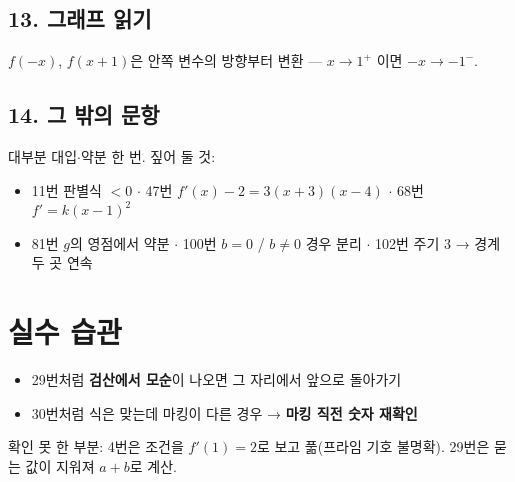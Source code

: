 \documentclass[11pt,a4paper]{article}
\begin{document}
\subsection{13. 그래프 읽기 }
$f(-x)$, $f(x+1)$은 안쪽 변수의 방향부터 변환 — $x\to1^+$ 이면 $-x\to-1^-$.

\subsection{14. 그 밖의 문항 }
대부분 대입$\cdot$약분 한 번. 짚어 둘 것:
\begin{itemize}
\item 11번 판별식 $<0$ \;$\cdot$\; 47번 $f'(x)-2=3(x+3)(x-4)$ \;$\cdot$\; 68번 $f'=k(x-1)^2$
\item 81번 $g$의 영점에서 약분 \;$\cdot$\; 100번 $b=0$ / $b\neq0$ 경우 분리 \;$\cdot$\; 102번 주기 3 → 경계 두 곳 연속
\end{itemize}

\section{실수 습관}
\begin{itemize}
\item 29번처럼 \textbf{검산에서 모순}이 나오면 그 자리에서 앞으로 돌아가기
\item 30번처럼 식은 맞는데 마킹이 다른 경우 → \textbf{마킹 직전 숫자 재확인}
\end{itemize}

{\small\color{gray} 확인 못 한 부분: 4번은 조건을 $f'(1)=2$로 보고 풂(프라임 기호 불명확). 29번은 묻는 값이 지워져 $a+b$로 계산.}
\end{document}
